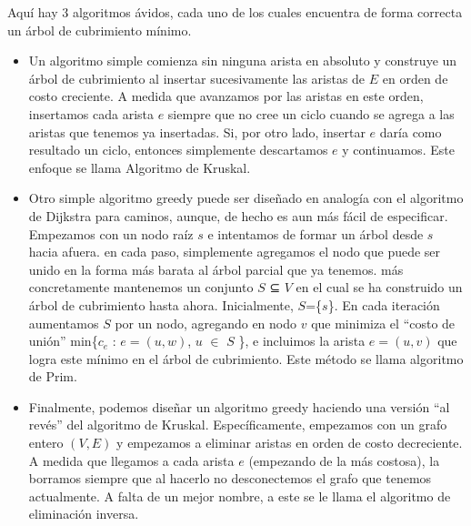 \documentclass[a4paper, 12pt]{book}
\theoremstyle{dotless}
\begin{document}
Aquí hay 3 algoritmos ávidos, cada uno de los cuales encuentra de forma correcta un árbol de cubrimiento mínimo.\\

\begin{itemize}

\item Un algoritmo simple comienza sin ninguna arista en absoluto y construye un árbol de cubrimiento al insertar sucesivamente las aristas de $E$ en orden de costo creciente. A medida que avanzamos por las aristas en este orden, insertamos cada arista $e$ siempre que no cree un ciclo cuando se agrega a las aristas que tenemos ya insertadas. Si, por otro lado, insertar $e$ daría como resultado un ciclo, entonces simplemente descartamos $e$ y continuamos. Este enfoque se llama Algoritmo de Kruskal.

\item Otro simple algoritmo greedy puede ser diseñado en analogía con el algoritmo de Dijkstra para caminos, aunque, de hecho es aun más fácil de especificar. Empezamos con un nodo raíz $s$ e intentamos de formar un árbol desde $s$ hacia afuera. en cada paso, simplemente agregamos el nodo que puede ser unido en la forma más barata al árbol parcial que ya tenemos. más concretamente mantenemos un conjunto $S$ ⊆ $V$ en el cual se ha construido un árbol de cubrimiento hasta ahora. Inicialmente, $S$=\{$s$\}. En cada iteración aumentamos $S$ por un nodo, agregando en nodo $v$ que minimiza el ``costo de unión'' min\{$c_e$ : $e=(u,w)$, $u$ \(\in\) $S$ \}, e incluimos la arista $e=(u,v)$ que logra este mínimo en el árbol de cubrimiento. Este método se llama algoritmo de Prim.

\item Finalmente, podemos diseñar un algoritmo greedy haciendo una versión ``al revés'' del algoritmo de Kruskal. Específicamente, empezamos con un grafo entero $(V,E)$ y empezamos a eliminar aristas en orden de costo decreciente. A medida que llegamos a cada arista $e$ (empezando de la más costosa), la borramos siempre que al hacerlo no desconectemos el grafo que tenemos actualmente. A falta de un mejor nombre, a este se le llama el algoritmo de eliminación inversa.
\end{itemize}
\end{document}

